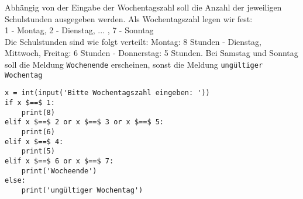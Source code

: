 \question[6]
Abhängig von der Eingabe der Wochentagszahl soll die Anzahl der jeweiligen Schulstunden ausgegeben werden.
Als Wochentagszahl legen wir fest: \\
1 - Montag, 2 - Dienstag, ... , 7 - Sonntag \\
Die Schulstunden sind wie folgt verteilt:
Montag: 8 Stunden - Dienstag, Mittwoch, Freitag: 6 Stunden - Donnerstag: 5 Stunden.
Bei Samstag und Sonntag soll die Meldung \texttt{Wochenende} erscheinen, sonst die Meldung \texttt{ungültiger Wochentag}
\begin{solutionbox}{8cm}
\begin{lstlisting}
x = int(input('Bitte Wochentagszahl eingeben: '))
if x $==$ 1:
    print(8)
elif x $==$ 2 or x $==$ 3 or x $==$ 5:
    print(6)
elif x $==$ 4:
    print(5)
elif x $==$ 6 or x $==$ 7:
    print('Wocheende')
else:
    print('ungültiger Wochentag')
\end{lstlisting}
\end{solutionbox}

